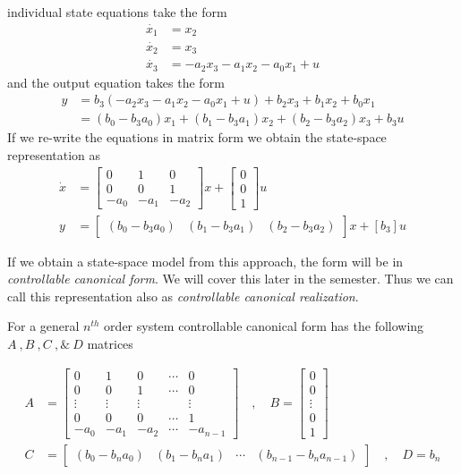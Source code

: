 \documentclass[twoside]{article}
\begin{document}
individual state equations take the form
%
\begin{align*}
\dot{x_1} &= x_2
\\
\dot{x_2} &= x_3
\\
\dot{x_3} &= -a_2 x_3 - a_1 x_2 - a_0 x_1 + u
\end{align*}
%
and the output equation takes the form
%
\begin{align*}
y &= b_3\left( -a_2 x_3 - a_1 x_2 - a_0 x_1 + u \right) + b_2 x_3 +
    b_1 x_2 + b_0 x_1
\\
&= ( b_0 - b_3 a_0 ) x_1 + ( b_1 - b_3 a_1 ) x_2 + ( b_2 - b_3 a_2 ) x_3 + b_3 u
\end{align*}
%
If we re-write the equations in matrix form we obtain the state-space representation as
%
\begin{align*}
	\dot{x} &= \left[ \begin{array}{ccc} 0 & 1 & 0  \\  0 & 0 & 1 \\  -a_0 & -a_1 & -a_2 \end{array} \right] x 
	+ \left[ \begin{array}{c} 0 \\ 0 \\ 1 \end{array} \right] u
	\\
	y &= \left[ \begin{array}{ccc} ( b_0 - b_3 a_0 ) & ( b_1 - b_3 a_1 )  & ( b_2 - b_3 a_2 ) \end{array} \right] x
	+ \left[ b_3 \right] u
\end{align*}

If we obtain a state-space model from this approach, the form
will be in \textit{controllable canonical form}. We will cover this
later in the semester. Thus we can call this representation also as 
\textit{controllable canonical realization}. 

For a general $n^{th}$ order system controllable
canonical form has the following $A \ ,  B \ ,  C \ , \& \ D$
matrices

\begin{align*}
A &= \left[ \begin{array}{ccccc} 0 & 1 & 0 & \cdots & 0 \\ 0 & 0 & 1 &
                                                                      \cdots & 0
\\ \vdots & \vdots & \vdots & & \vdots
\\ 0 & 0 & 0 & \cdots & 1
    \\ -a_0 & -a_1 & -a_2 & \cdots & -a_{n-1} \end{array} \right]
\quad , \quad 
B = \left[ \begin{array}{c} 0\\ 0 \\ \vdots \\ 0
    \\ 1 \end{array} \right]
\\ C &= \left[ \begin{array}{cccc} (b_0 - b_n a_0) 
  &  (b_1 - b_n a_1) & \cdots & (b_{n-1} - b_n a_{n-1}) \end{array} \right]
\quad , \quad
D = b_n
\end{align*}
\end{document}
